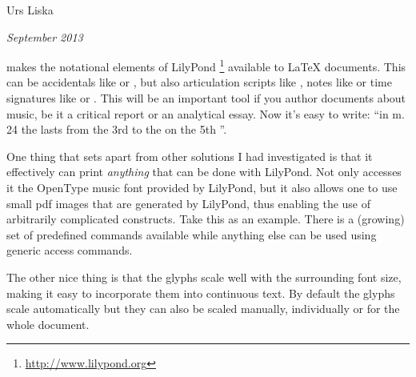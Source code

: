 \documentclass[oneside]{article}
\begin{document}
\begin{center}
{ \Huge \lilyglyphs }

\bigskip
{ \Large Urs Liska }

\emph{September 2013} 

\end{center}

\bigskip
\lilyglyphs{} makes the notational elements of LilyPond%
\footnote{\url{http://www.lilypond.org}}
available to \LaTeX{} documents.
This can be accidentals like \flat{} or \sharp, but also articulation scripts like \hspace{.1ex} \fermata, notes like \crotchet{} or time signatures like \lilyTimeCHalf{} or .
This will be an important tool if you author documents about music, be it a critical report or an analytical essay.
Now it's easy to write: “in m.\,24 the \decrescHairpin{} lasts from the 3rd to the  on the 5th \semiquaverDown”.

One thing that sets \lilyglyphs{} apart from other solutions I had investigated is that it effectively can print \emph{anything} that can be done with LilyPond. 
Not only accesses it the OpenType music font provided by LilyPond, but it also allows one to use small pdf images that are generated by LilyPond, thus enabling the use of arbitrarily complicated constructs.
Take this  \fancyExample{} as an example.
There is a (growing) set of predefined commands available while anything else can be used using generic access commands.

The other nice thing is that the glyphs scale well with the surrounding font size, making it easy to incorporate them into continuous text.
By default the glyphs scale automatically but they can also be scaled manually, individually or for the whole document.
\end{document}
